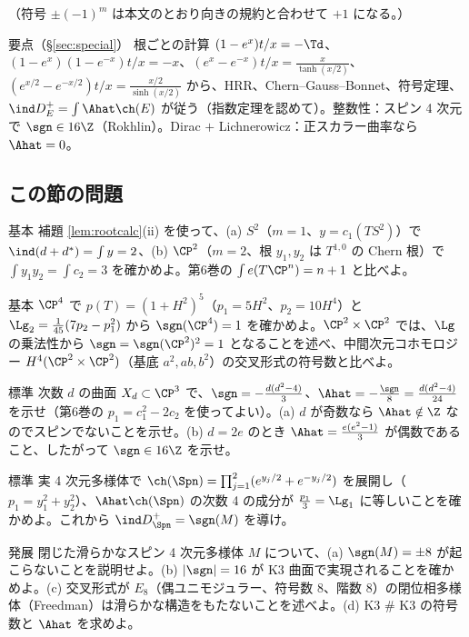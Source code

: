 （符号 $\pm(-1)^m$ は本文のとおり向きの規約と合わせて $+1$ になる。）
\begin{keybox}{要点（\S\ref{sec:special}）}
根ごとの計算 $(1-e^x)t/x=-\Td$、$(1-e^x)(1-e^{-x})t/x=-x$、$(e^x-e^{-x})t/x=\frac x{\tanh(x/2)}$、$(e^{x/2}-e^{-x/2})t/x=\frac{x/2}{\sinh(x/2)}$ から、HRR、Chern--Gauss--Bonnet、符号定理、$\ind D_E^+=\int\Ahat\ch(E)$ が従う（指数定理を認めて）。整数性：スピン 4 次元で $\sgn\in16\Z$（Rokhlin）。Dirac $+$ Lichnerowicz：正スカラー曲率なら $\Ahat=0$。
\end{keybox}
\subsection*{この節の問題}
\begin{prob}{基本}\label{p:deRhamAS}
補題 \ref{lem:rootcalc}(ii) を使って、(a) $S^2$（$m=1$、$y=c_1(TS^2)$）で $\ind(d+d^*)=\int y=2$、(b) $\CP^2$（$m=2$、根 $y_1,y_2$ は $T^{1,0}$ の Chern 根）で $\int y_1y_2=\int c_2=3$ を確かめよ。第6巻の $\int e(T\CP^n)=n+1$ と比べよ。
\end{prob}
\begin{prob}{基本}\label{p:CP4}
$\CP^4$ で $p(T)=(1+H^2)^5$（$p_1=5H^2$、$p_2=10H^4$）と $\Lg_2=\frac1{45}(7p_2-p_1^2)$ から $\sgn(\CP^4)=1$ を確かめよ。$\CP^2\times\CP^2$ では、$\Lg$ の乗法性から $\sgn=\sgn(\CP^2)^2=1$ となることを述べ、中間次元コホモロジー $H^4(\CP^2\times\CP^2)$（基底 $a^2,ab,b^2$）の交叉形式の符号数と比べよ。
\end{prob}
\begin{prob}{標準}\label{p:Rokhlin}
次数 $d$ の曲面 $X_d\subset\CP^3$ で、$\sgn=-\frac{d(d^2-4)}3$、$\Ahat=-\frac\sgn8=\frac{d(d^2-4)}{24}$ を示せ（第6巻の $p_1=c_1^2-2c_2$ を使ってよい）。(a) $d$ が奇数なら $\Ahat\notin\Z$ なのでスピンでないことを示せ。(b) $d=2e$ のとき $\Ahat=\frac{e(e^2-1)}3$ が偶数であること、したがって $\sgn\in16\Z$ を示せ。
\end{prob}
\begin{prob}{標準}\label{p:twistS}
実 4 次元多様体で $\ch(\Spn)=\prod_{j=1}^2(e^{y_j/2}+e^{-y_j/2})$ を展開し（$p_1=y_1^2+y_2^2$）、$\Ahat\ch(\Spn)$ の次数 4 の成分が $\frac{p_1}3=\Lg_1$ に等しいことを確かめよ。これから $\ind D_{\Spn}^+=\sgn(M)$ を導け。
\end{prob}
\begin{prob}{発展}\label{p:E8}
閉じた滑らかなスピン 4 次元多様体 $M$ について、(a) $\sgn(M)=\pm8$ が起こらないことを説明せよ。(b) $|\sgn|=16$ が K3 曲面で実現されることを確かめよ。(c) 交叉形式が $E_8$（偶ユニモジュラー、符号数 $8$、階数 $8$）の閉位相多様体（Freedman）は滑らかな構造をもたないことを述べよ。(d) K3 $\#$ K3 の符号数と $\Ahat$ を求めよ。
\end{prob}

